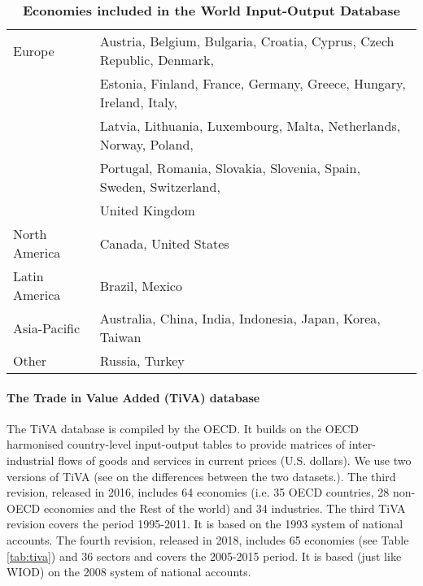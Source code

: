 \documentclass[12pt,a4paper]{paper}
\begin{document}
 
\begin{table}[!h]
\begin{threeparttable}
\centering
\centering
\caption{\small{\textbf{Economies included in the World Input-Output Database}}}
\small
\begin{tabular}{ll}
\hline\hline
Europe & Austria, Belgium, Bulgaria, Croatia, Cyprus, Czech Republic, Denmark,\\
& Estonia, Finland, France, Germany, Greece, Hungary, Ireland, Italy,\\
& Latvia, Lithuania, Luxembourg, Malta, Netherlands, Norway, Poland,\\
&Portugal, Romania, Slovakia, Slovenia, Spain, Sweden, Switzerland,\\
& United Kingdom\\
North  America& Canada, United States\\
Latin America & Brazil, Mexico \\
Asia-Pacific & Australia, China, India, Indonesia, Japan, Korea, Taiwan\\
Other & Russia, Turkey\\
\hline\hline
\end{tabular} 
\label{tab:wiod}
\end{threeparttable}
\end{table} 
\paragraph{The Trade in Value Added (TiVA) database}
The TiVA database is compiled by the OECD. 
It builds on the OECD harmonised country-level input-output tables to provide matrices of inter-industrial flows of goods and services in current prices (U.S. dollars).
We use two versions of TiVA (see \cite{OECD2018} on the differences between the two datasets.).
The third revision, released in 2016, includes 64 economies (i.e. 35 OECD countries, 28 non-OECD economies and the Rest of the world) and 34 industries. 
The third TiVA revision covers the period 1995-2011. It is based on the 1993 system of national accounts.
The fourth revision, released in 2018, includes 65 economies (see Table \ref{tab:tiva}) and 36 sectors and covers the 2005-2015 period. It is based (just like WIOD) on the 2008 system of national accounts.
\end{document}
